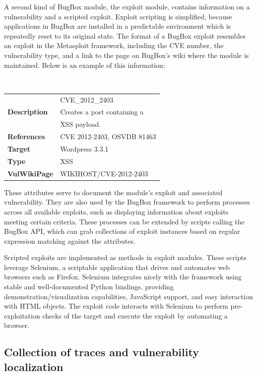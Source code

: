 \documentclass[letterpaper,twocolumn,10pt]{article}
\begin{document}
A second kind of BugBox module, the exploit module, contains information on a vulnerability and a scripted exploit. Exploit scripting is simplified, because applications in BugBox are installed in a predictable environment which is repeatedly reset to its original state. The format of a BugBox exploit resembles an exploit in the Metasploit framework, including the CVE number, the vulnerability type, and a link to the page on BugBox's wiki where the module is maintained. Below is an example of this information:

\begin{minipage}{\textwidth}
{\tt \small
\begin{tabular} { l l }
\noindent{\bf Name}&CVE\_2012\_2403\\
{\bf Description}&Creates a post containing a\\& XSS payload.\\
{\bf References}&CVE 2012-2403, OSVDB 81463 \\
{\bf Target}&Wordpress 3.3.1\\
{\bf Type}&XSS\\
{\bf VulWikiPage}&WIKIHOST/CVE-2012-2403
\end{tabular}
}
\end{minipage}

These attributes serve to document the module's exploit and associated vulnerability. They are also used by the BugBox framework to perform processes across all available exploits, such as displaying information about exploits meeting certain criteria. These processes can be extended by scripts calling the BugBox API, which can grab collections of exploit instances based on regular expression matching against the attributes.

Scripted exploits are implemented as methods in exploit modules. These scripts leverage Selenium, a scriptable application that drives and automates web browsers such as Firefox. Selenium integrates nicely with the framework using stable and well-documented Python bindings, providing demonstration/visualization capabilities, JavaScript support, and easy interaction with HTML objects. The exploit code interacts with Selenium to perform pre-exploitation checks of the target and execute the exploit by automating a browser.

\subsection{Collection of traces and vulnerability localization}
\end{document}
